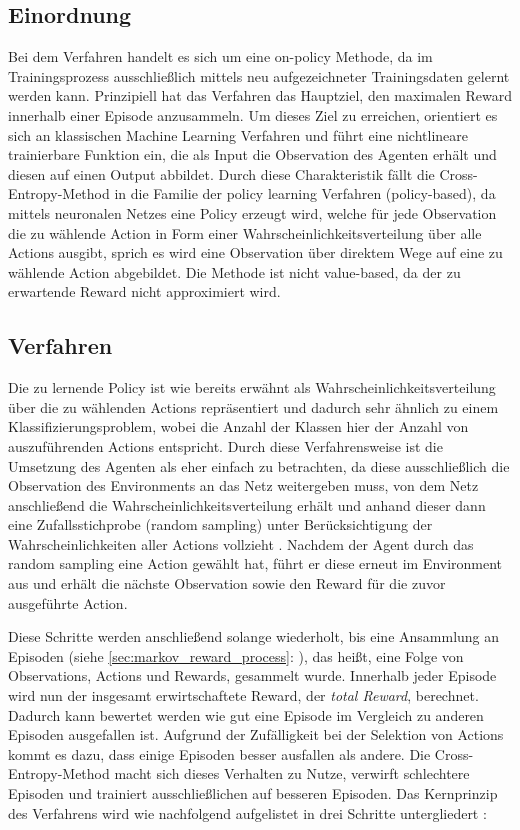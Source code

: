 \documentclass[11pt]{scrartcl}
\begin{document}
\subsection{Einordnung}
Bei dem Verfahren handelt es sich um eine on-policy Methode, da im Trainingsprozess ausschließlich
mittels neu aufgezeichneter Trainingsdaten gelernt werden kann. Prinzipiell hat das Verfahren das
Hauptziel, den maximalen Reward innerhalb einer Episode anzusammeln. Um dieses Ziel zu erreichen,
orientiert es sich an klassischen Machine Learning Verfahren und führt eine nichtlineare trainierbare
Funktion ein, die als Input die Observation des Agenten erhält und diesen auf einen Output abbildet.
Durch diese Charakteristik fällt die Cross-Entropy-Method in die Familie der policy learning Verfahren
(policy-based), da mittels neuronalen Netzes eine Policy erzeugt wird, welche für jede Observation die
zu wählende Action in Form einer Wahrscheinlichkeitsverteilung über alle Actions ausgibt, sprich es
wird eine Observation über direktem Wege auf eine zu wählende Action abgebildet. Die
Methode ist nicht value-based, da der zu erwartende Reward nicht approximiert wird.

\subsection{Verfahren}
Die zu lernende Policy ist wie bereits erwähnt als Wahrscheinlichkeitsverteilung über die 
zu wählenden Actions repräsentiert und dadurch sehr ähnlich zu einem Klassifizierungsproblem,
wobei die Anzahl der Klassen hier der Anzahl von auszuführenden Actions entspricht. Durch
diese Verfahrensweise ist die Umsetzung des Agenten als eher einfach zu betrachten, da
diese ausschließlich die Observation des Environments an das Netz weitergeben muss, von
dem Netz anschließend die Wahrscheinlichkeitsverteilung erhält und anhand dieser dann eine
Zufallsstichprobe (random sampling) unter Berücksichtigung der Wahrscheinlichkeiten aller
Actions vollzieht \cite[~S.78]{L2018}. Nachdem der Agent durch das random sampling eine
Action gewählt hat, führt er diese erneut im Environment aus und erhält die nächste
Observation sowie den Reward für die zuvor ausgeführte Action.

Diese Schritte werden anschließend solange wiederholt, bis eine Ansammlung an Episoden (siehe 
\autoref{sec:markov_reward_process}: ), das heißt, eine Folge
von Observations, Actions und Rewards, gesammelt wurde. Innerhalb jeder Episode wird nun der
insgesamt erwirtschaftete Reward, der \textit{total Reward}, berechnet. Dadurch kann bewertet werden
wie gut eine Episode im Vergleich zu anderen Episoden ausgefallen ist. Aufgrund der Zufälligkeit
bei der Selektion von Actions kommt es dazu, dass einige Episoden besser ausfallen als andere.
Die Cross-Entropy-Method macht sich dieses Verhalten zu Nutze, verwirft schlechtere Episoden und
trainiert ausschließlichen auf besseren Episoden. Das Kernprinzip des Verfahrens wird wie nachfolgend
aufgelistet in drei Schritte untergliedert \cite[~S.80 f.]{L2018}:
\end{document}
